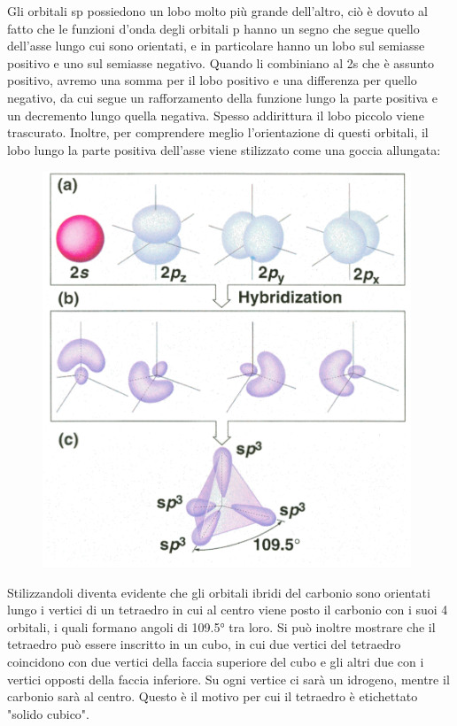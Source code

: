 Gli orbitali sp possiedono un lobo molto più grande dell'altro, ciò è dovuto al fatto che le funzioni d'onda degli orbitali p hanno un segno che segue quello dell'asse lungo cui sono orientati, e in particolare hanno un lobo sul semiasse positivo e uno sul semiasse negativo. Quando li combiniano al 2s che è assunto positivo, avremo una somma per il lobo positivo e una differenza per quello negativo, da cui segue un rafforzamento della funzione lungo la parte positiva e un decremento lungo quella negativa. Spesso addirittura il lobo piccolo viene trascurato. Inoltre, per comprendere meglio l'orientazione di questi orbitali, il lobo lungo la parte positiva dell'asse viene stilizzato come una goccia allungata:

\begin{figure}[htp]
    \centering
    \includegraphics[width=11cm]{immagini/orbitali-sp3.png}
\end{figure}
Stilizzandoli diventa evidente che gli orbitali ibridi del carbonio sono orientati lungo i vertici di un tetraedro in cui al centro viene posto il carbonio con i suoi 4 orbitali, i quali formano angoli di 109.5° tra loro. Si può inoltre mostrare che il tetraedro può essere inscritto in un cubo, in cui due vertici del tetraedro coincidono con due vertici della faccia superiore del cubo e gli altri due con i vertici opposti della faccia inferiore. Su ogni vertice ci sarà un idrogeno, mentre il carbonio sarà al centro. Questo è il motivo per cui il tetraedro è etichettato "solido cubico".

